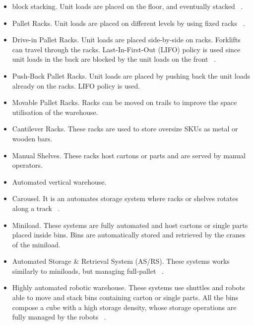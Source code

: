 \begin{itemize}
    \item block stacking. Unit loads are placed on the floor, and eventually stacked ~\cite{Accorsi2017b, Goetschalckx1991, Nishi2010}.
    \item Pallet Racks. Unit loads are placed on different levels by using fixed racks ~\cite{Azadivar1989, Bassan1980, Bortolini2015a, Cardona2013, Roberts1972, Thomas2013}.
    \item Drive-in Pallet Racks. Unit loads are placed side-by-side on racks. Forklifts can travel through the racks. Last-In-First-Out (LIFO) policy is used since unit loads in the back are blocked by the unit loads on the front ~\cite{Manzini2016}.
    \item Push-Back Pallet Racks. Unit loads are placed by pushing back the unit loads already on the racks. LIFO policy is used.
    \item Movable Pallet Racks. Racks can be moved on trails to improve the space utilisation of the warehouse.
    \item Cantilever Racks. These racks are used to store oversize SKUs as metal or wooden bars.
    \item Manual Shelves. These racks host cartons or parts and are served by manual operators.
    \item Automated vertical warehouse. 
    \item Carousel. It is an automates storage system where racks or shelves rotates along a track ~\cite{Hua2008, Hwang1994, Lee1988, Vickson1998}.
    \item Miniload. These systems are fully automated and host cartons or single parts placed inside bins. Bins are automatically stored and retrieved by the cranes of the miniload.
    \item Automated Storage \& Retrieval System (AS/RS). These systems works similarly to miniloads, but managing full-pallet ~\cite{DeKoster2007, Karasawa1980, Manzini2006b, Regattieri2013, Rosenblatt1993, Tappia2015}.
    \item Highly automated robotic warehouse. These systems use shuttles and robots able to move and stack bins containing carton or single parts. All the bins compose a cube with a high storage density, whose storage operations are fully managed by the robots ~\cite{Lerher2016}.

\end{itemize}

